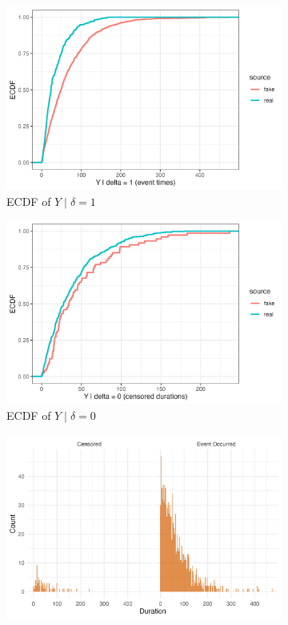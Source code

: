 \begin{figure}[htbp]
\centering
\begin{subfigure}[t]{0.3\textwidth}
  \centering
  \includegraphics[width=\linewidth]{images/ppc_event_ecdf_A1000.png}  %
  \caption{ECDF of $Y \mid \delta=1$}
  \label{fig:ecdf-event_a1000}
\end{subfigure}\hfill
\begin{subfigure}[t]{0.3\textwidth}
  \centering
  \includegraphics[width=\linewidth]{images/ppc_censored_ecdf_A1000.png} 
  \caption{ECDF of $Y \mid \delta=0$}
  \label{fig:ecdf-cens_a1000}
\end{subfigure}\hfill
\begin{subfigure}[t]{0.37\textwidth}
  \centering
  \includegraphics[width=\linewidth]{images/fake_duration_hist_a1000.png}   %

\end{subfigure}
\end{figure}

